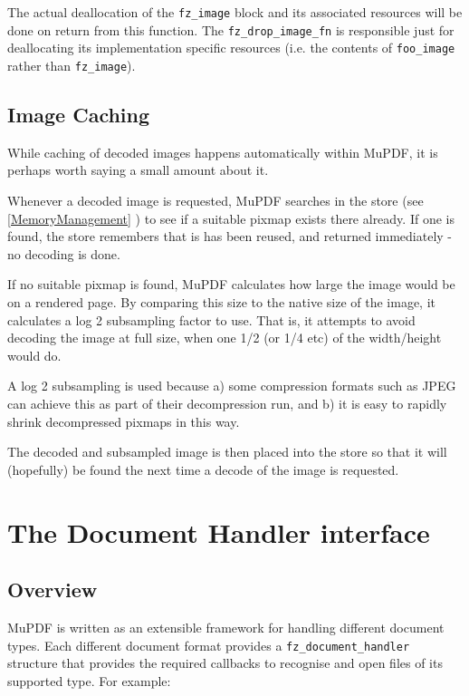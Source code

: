 \documentclass[oneside]{book}
\newcommand{\rjwref}[1] {\autoref{#1} \nameref{#1}}
\begin{document}
The actual deallocation of the \texttt{fz\_image} block and its associated resources will be done on return from this function. The \texttt{fz\_drop\_image\_fn} is responsible just for deallocating its implementation specific resources (i.e. the contents of \texttt{foo\_image} rather than \texttt{fz\_image}).

\section{Image Caching}

While caching of decoded images happens automatically within MuPDF, it is perhaps worth saying a small amount about it.

Whenever a decoded image is requested, MuPDF searches in the store (see \rjwref{MemoryManagement}) to see if a suitable pixmap exists there already. If one is found, the store remembers that is has been reused, and returned immediately - no decoding is done.

If no suitable pixmap is found, MuPDF calculates how large the image would be on a rendered page. By comparing this size to the native size of the image, it calculates a log 2 subsampling factor to use. That is, it attempts to avoid decoding the image at full size, when one 1/2 (or 1/4 etc) of the width/height would do.

A log 2 subsampling is used because a) some compression formats such as JPEG can achieve this as part of their decompression run, and b) it is easy to rapidly shrink decompressed pixmaps in this way.

The decoded and subsampled image is then placed into the store so that it will (hopefully) be found the next time a decode of the image is requested.

\chapter{The Document Handler interface}
\label{DocumentHandler}

\section{Overview}

MuPDF is written as an extensible framework for handling different document types. Each different document format provides a \texttt{fz\_document\_handler} structure that provides the required callbacks to recognise and open files of its supported type. For example:
\end{document}
